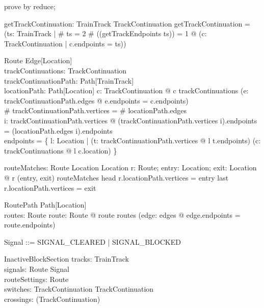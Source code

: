 \begin{zproof}
prove by reduce;
\end{zproof}

\begin{axdef}
  getTrackContinuation: \finset  TrainTrack \pfun  TrackContinuation
\where
  getTrackContinuation = (\lambda  ts: \finset  TrainTrack | \# ts = 2 \land  \# (\bigcap  (getTrackEndpoints ts)) = 1 @ (\mu  c: TrackContinuation | c.endpoints = ts))
\end{axdef}

\begin{schema}{Route}
  Edge[Location]\\
  trackContinuations: \finset  TrackContinuation\\
  trackContinuationPath: Path[TrainTrack]\\
  locationPath: Path[Location]
\where
  \forall  c: TrackContinuation @ c \in  trackContinuations \iff  (\exists  e: \ran  trackContinuationPath.edges @ e.endpoints = c.endpoints)\\
  \# trackContinuationPath.vertices = \# locationPath.edges\\
  \forall  i: \dom  trackContinuationPath.vertices @ (trackContinuationPath.vertices i).endpoints = (locationPath.edges i).endpoints\\
  endpoints = \{  l: Location | (\exists  t: \ran  trackContinuationPath.vertices @ l \in  t.endpoints) \land  (\forall  c: trackContinuations @ l \neq  c.location) \}
\end{schema}

\begin{axdef}
  routeMatches: Route \rel  Location \cross  Location
\where
  \forall  r: Route; entry: Location; exit: Location @ r \mapsto  (entry, exit) \in  routeMatches \iff  head r.locationPath.vertices = entry \land  last r.locationPath.vertices = exit
\end{axdef}

\begin{schema}{RoutePath}
  Path[Location]\\
  routes: \finset  Route
\where
  \forall  route: Route @ route \in  routes \iff  (\exists  edge: \ran  edges @ edge.endpoints = route.endpoints)
\end{schema}

\begin{zed}
Signal ::= SIGNAL\_CLEARED | SIGNAL\_BLOCKED
\end{zed}

\begin{schema}{InactiveBlockSection}
  tracks: \finset  TrainTrack\\
  signals: Route \pfun  Signal\\
  routeSettings: \finset  Route\\
  switches: \finset  TrackContinuation \pfun  TrackContinuation\\
  crossings: \finset  (\finset  TrackContinuation)
\end{schema}


